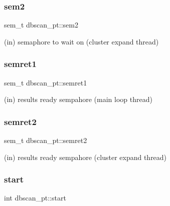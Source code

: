 \mbox{\label{structdbscan__pt_a5123f8b35d2933f40d493fe31dc062c5}} 
\subsubsection{\texorpdfstring{sem2}{sem2}}
{\footnotesize\ttfamily sem\+\_\+t dbscan\+\_\+pt\+::sem2}



(in) semaphore to wait on (cluster expand thread) 

\mbox{\label{structdbscan__pt_af4a16a1139b3ee7e1dfcec9d415a8855}} 
\subsubsection{\texorpdfstring{semret1}{semret1}}
{\footnotesize\ttfamily sem\+\_\+t dbscan\+\_\+pt\+::semret1}



(in) results ready sempahore (main loop thread) 

\mbox{\label{structdbscan__pt_a229860660f580c96e3f00820dedc314f}} 
\subsubsection{\texorpdfstring{semret2}{semret2}}
{\footnotesize\ttfamily sem\+\_\+t dbscan\+\_\+pt\+::semret2}



(in) results ready sempahore (cluster expand thread) 

\mbox{\label{structdbscan__pt_ab35e524b61208589ee28bbf4a79341ae}} 
\subsubsection{\texorpdfstring{start}{start}}
{\footnotesize\ttfamily int dbscan\+\_\+pt\+::start}



